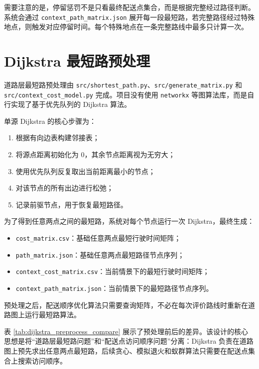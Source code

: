\documentclass[12pt,a4paper,UTF8]{article}
\begin{document}
需要注意的是，停留惩罚不是只看最终配送点集合，而是根据完整经过路径判断。系统会通过 \texttt{context\_path\_matrix.json} 展开每一段最短路，若完整路径经过特殊地点，则触发对应停留时间。每个特殊地点在一条完整路线中最多只计算一次。

\section{Dijkstra 最短路预处理}

道路层最短路预处理由 \texttt{src/shortest\_path.py}、\texttt{src/generate\_matrix.py} 和 \texttt{src/context\_cost\_model.py} 完成。项目没有使用 \texttt{networkx} 等图算法库，而是自行实现了基于优先队列的 Dijkstra 算法。

单源 Dijkstra 的核心步骤为：
\begin{enumerate}[label=(\arabic*)]
    \item 根据有向边表构建邻接表；
    \item 将源点距离初始化为 0，其余节点距离视为无穷大；
    \item 使用优先队列反复取出当前距离最小的节点；
    \item 对该节点的所有出边进行松弛；
    \item 记录前驱节点，用于恢复最短路径。
\end{enumerate}

为了得到任意两点之间的最短路，系统对每个节点运行一次 Dijkstra，最终生成：
\begin{itemize}
    \item \texttt{cost\_matrix.csv}：基础任意两点最短行驶时间矩阵；
    \item \texttt{path\_matrix.json}：基础任意两点最短路径节点序列；
    \item \texttt{context\_cost\_matrix.csv}：当前情景下的最短行驶时间矩阵；
    \item \texttt{context\_path\_matrix.json}：当前情景下的最短路径节点序列。
\end{itemize}

预处理之后，配送顺序优化算法只需要查询矩阵，不必在每次评价路线时重新在道路图上运行最短路算法。

表 \ref{tab:dijkstra_preprocess_compare} 展示了预处理前后的差异。该设计的核心思想是将“道路层最短路问题”和“配送点访问顺序问题”分离：Dijkstra 负责在道路图上预先求出任意两点最短路，后续贪心、模拟退火和蚁群算法只需要在配送点集合上搜索访问顺序。
\end{document}
